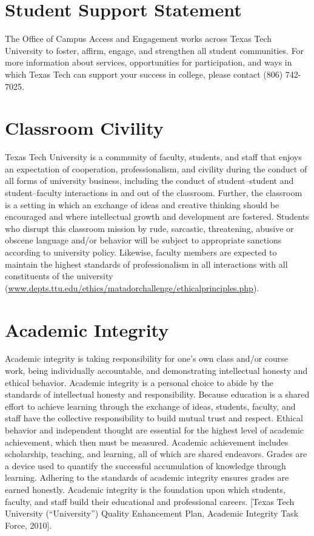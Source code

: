 \documentclass[12pt, notitlepage]{article}   	%
\begin{document}
{\section{Student Support Statement}
The Office of Campus Access and Engagement works across Texas Tech
University to foster, affirm, engage, and strengthen all student
communities. For more information about services, opportunities for
participation, and ways in which Texas Tech can support your success in
college, please contact (806) 742-7025.

\section{Classroom Civility}
Texas Tech University is a community of faculty, students, and staff that
enjoys an expectation of cooperation, professionalism, and civility during
the conduct of all forms of university business, including the conduct of
student–student and student–faculty interactions in and out of the
classroom. Further, the classroom is a setting in which an exchange of ideas
and creative thinking should be encouraged and where intellectual growth
and development are fostered. Students who disrupt this classroom mission
by rude, sarcastic, threatening, abusive or obscene language and/or
behavior will be subject to appropriate sanctions according to university
policy. Likewise, faculty members are expected to maintain the highest
standards of professionalism in all interactions with all constituents of the
university (\url{www.depts.ttu.edu/ethics/matadorchallenge/ethicalprinciples.php}).

\section{Academic Integrity}
Academic integrity is taking responsibility for one's own class and/or course work, being
individually accountable, and demonstrating intellectual honesty and ethical behavior. Academic
integrity is a personal choice to abide by the standards of intellectual honesty and responsibility.
Because education is a shared effort to achieve learning through the exchange of ideas, students,
faculty, and staff have the collective responsibility to build mutual trust and respect. Ethical
behavior and independent thought are essential for the highest level of academic achievement,
which then must be measured. Academic achievement includes scholarship, teaching, and learning,
all of which are shared endeavors. Grades are a device used to quantify the successful
accumulation of knowledge through learning. Adhering to the standards of academic integrity
ensures grades are earned honestly. Academic integrity is the foundation upon which students,
faculty, and staff build their educational and professional careers. [Texas Tech University
(“University”) Quality Enhancement Plan, Academic Integrity Task Force, 2010].

}
\end{document}
